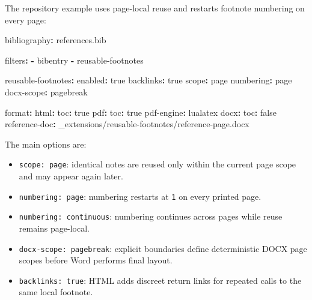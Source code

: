 \documentclass[
  letterpaper,
  DIV=11,
  numbers=noendperiod]{scrartcl}
\newenvironment{Shaded}{\begin{snugshade}}{\end{snugshade}}
\newcommand{\AttributeTok}[1]{\textcolor[rgb]{0.40,0.45,0.13}{#1}}
\newcommand{\CharTok}[1]{\textcolor[rgb]{0.13,0.47,0.30}{#1}}
\newcommand{\FunctionTok}[1]{\textcolor[rgb]{0.28,0.35,0.67}{#1}}
\newcommand{\KeywordTok}[1]{\textcolor[rgb]{0.00,0.23,0.31}{\textbf{#1}}}
\providecommand{\tightlist}{%
  \setlength{\itemsep}{0pt}\setlength{\parskip}{0pt}}
\begin{document}
The repository example uses page-local reuse and restarts footnote
numbering on every page:

\begin{Shaded}
\begin{Highlighting}[]
\FunctionTok{bibliography}\KeywordTok{:}\AttributeTok{ references.bib}

\FunctionTok{filters}\KeywordTok{:}
\AttributeTok{  }\KeywordTok{{-}}\AttributeTok{ bibentry}
\AttributeTok{  }\KeywordTok{{-}}\AttributeTok{ reusable{-}footnotes}

\FunctionTok{reusable{-}footnotes}\KeywordTok{:}
\AttributeTok{  }\FunctionTok{enabled}\KeywordTok{:}\AttributeTok{ }\CharTok{true}
\AttributeTok{  }\FunctionTok{backlinks}\KeywordTok{:}\AttributeTok{ }\CharTok{true}
\AttributeTok{  }\FunctionTok{scope}\KeywordTok{:}\AttributeTok{ page}
\AttributeTok{  }\FunctionTok{numbering}\KeywordTok{:}\AttributeTok{ page}
\AttributeTok{  }\FunctionTok{docx{-}scope}\KeywordTok{:}\AttributeTok{ pagebreak}

\FunctionTok{format}\KeywordTok{:}
\AttributeTok{  }\FunctionTok{html}\KeywordTok{:}
\AttributeTok{    }\FunctionTok{toc}\KeywordTok{:}\AttributeTok{ }\CharTok{true}
\AttributeTok{  }\FunctionTok{pdf}\KeywordTok{:}
\AttributeTok{    }\FunctionTok{toc}\KeywordTok{:}\AttributeTok{ }\CharTok{true}
\AttributeTok{    }\FunctionTok{pdf{-}engine}\KeywordTok{:}\AttributeTok{ lualatex}
\AttributeTok{  }\FunctionTok{docx}\KeywordTok{:}
\AttributeTok{    }\FunctionTok{toc}\KeywordTok{:}\AttributeTok{ }\CharTok{false}
\AttributeTok{    }\FunctionTok{reference{-}doc}\KeywordTok{:}\AttributeTok{ \_extensions/reusable{-}footnotes/reference{-}page.docx}
\end{Highlighting}
\end{Shaded}

The main options are:

\begin{itemize}
\tightlist
\item
  \texttt{scope:\ page}: identical notes are reused only within the
  current page scope and may appear again later.
\item
  \texttt{numbering:\ page}: numbering restarts at \texttt{1} on every
  printed page.
\item
  \texttt{numbering:\ continuous}: numbering continues across pages
  while reuse remains page-local.
\item
  \texttt{docx-scope:\ pagebreak}: explicit \texttt{} boundaries define
  deterministic DOCX page scopes before Word performs final layout.
\item
  \texttt{backlinks:\ true}: HTML adds discreet return links for
  repeated calls to the same local footnote.
\end{itemize}
\end{document}
